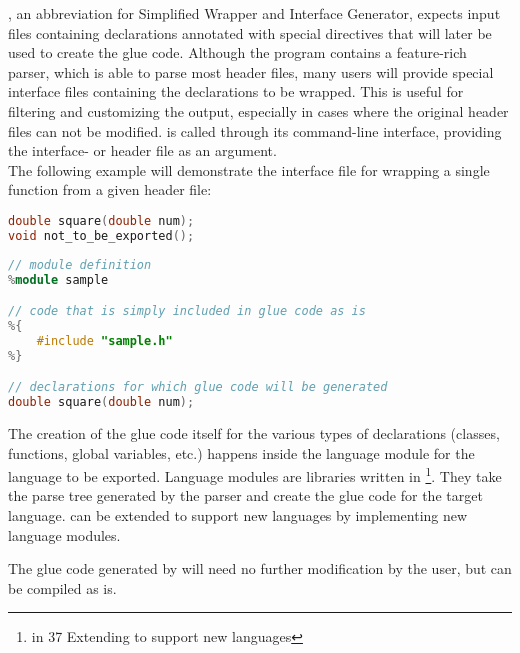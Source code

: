 
, an abbreviation for Simplified Wrapper and Interface Generator, expects input files containing  declarations annotated with special  directives that will later be used to create the glue code. Although the program contains a feature-rich  parser, which is able to parse most  header files, many users will provide special  interface files containing the declarations to be wrapped. This is useful for filtering and customizing the output, especially in cases where the original header files can not be modified.  is called through its command-line interface, providing the interface- or header file as an argument.
\\The following example will demonstrate the interface file for wrapping a single function from a given header file:

\SingleSpacing
\begin{lstlisting}[language=C++, caption=Original header file: sample.h]
double square(double num);
void not_to_be_exported();
\end{lstlisting}
\OnehalfSpacing

\SingleSpacing
\begin{lstlisting}[language=C++, caption=According \myProperName{SWIG} interface file]
// module definition
%module sample

// code that is simply included in glue code as is
%{
    #include "sample.h"
%}

// declarations for which glue code will be generated
double square(double num);
\end{lstlisting}
\OnehalfSpacing

The creation of the glue code itself for the various types of declarations (classes, functions, global variables, etc.) happens inside the language module for the language to be exported. Language modules are libraries written in \footnote{\citep{SWIGHPDoc} in 37 Extending  to support new languages}. They take the parse tree generated by the  parser and create the glue code for the target language.  can be extended to support new languages by implementing new language modules.

The glue code generated by  will need no further modification by the user, but can be compiled as is.

